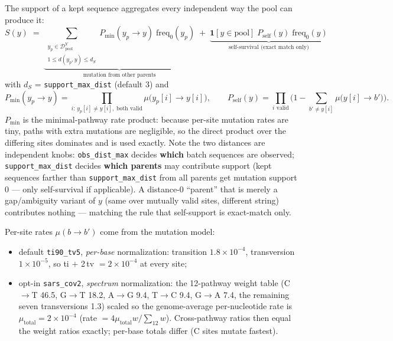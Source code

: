 \documentclass[11pt]{article}
\begin{document}
The support of a kept sequence aggregates every independent way the pool
can produce it:
\begin{equation}\label{eq:support}
S(y) \;=\;
\underbrace{\sum_{\substack{y_p \in \mathcal{D}^Y_{\text{pool}}\\
1 \le d(y_p, y) \le d_S}}
P_{\min}(y_p \!\to\! y)\; \text{freq}_0(y_p)}_{\text{mutation from other parents}}
\;+\;
\underbrace{\mathbf{1}[y \in \text{pool}]\;
P_{\text{self}}(y)\; \text{freq}_0(y)}_{\text{self-survival (exact match only)}}
\end{equation}
with $d_S$ = \texttt{support\_max\_dist} (default 3) and
\begin{equation}\label{eq:pmin}
P_{\min}(y_p \!\to\! y) = \prod_{i:\, y_p[i] \ne y[i],\; \text{both valid}}
\mu\big(y_p[i] \!\to\! y[i]\big),
\qquad
P_{\text{self}}(y) = \prod_{i \text{ valid}}
\Big(1 - \sum_{b' \ne y[i]} \mu\big(y[i] \!\to\! b'\big)\Big).
\end{equation}
$P_{\min}$ is the minimal-pathway rate product: because per-site mutation
rates are tiny, paths with extra mutations are negligible, so the direct
product over the differing sites dominates and is used exactly. Note the
two distances are independent knobs: \texttt{obs\_dist\_max} decides
\textbf{which} batch sequences are observed; \texttt{support\_max\_dist}
decides \textbf{which parents} may contribute support (kept sequences
farther than \texttt{support\_max\_dist} from all parents get mutation
support 0 --- only self-survival if applicable). A distance-0 ``parent''
that is merely a gap/ambiguity variant of $y$ (same over mutually valid
sites, different string) contributes nothing --- matching the rule that
self-support is exact-match only.

Per-site rates $\mu(b \!\to\! b')$ come from the mutation model:
\begin{itemize}
\item default \texttt{ti90\_tv5}, \emph{per-base} normalization:
transition $1.8\times10^{-4}$, transversion $1\times10^{-5}$, so
ti $+$ 2\,tv $= 2\times10^{-4}$ at every site;
\item opt-in \texttt{sars\_cov2}, \emph{spectrum} normalization: the
12-pathway weight table (C$\to$T 46.5, G$\to$T 18.2, A$\to$G 9.4,
T$\to$C 9.4, G$\to$A 7.4, the remaining seven transversions 1.3) scaled
so the genome-average per-nucleotide rate is $\mu_{\text{total}} =
2\times10^{-4}$ (rate $= 4\mu_{\text{total}} w / \sum_{12} w$).
Cross-pathway ratios then equal the weight ratios exactly; per-base
totals differ (C sites mutate fastest).
\end{itemize}
\end{document}
